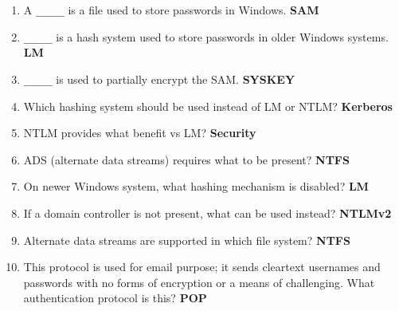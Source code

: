 \begin{enumerate}
    \item A \verb|_____| is a file used to store passwords in Windows. \textbf{SAM} 
    \item \verb|_____| is a hash system used to store passwords in older Windows systems. \textbf{LM} 
    \item \verb|_____| is used to partially encrypt the SAM. \textbf{SYSKEY} 
    \item Which hashing system should be used instead of LM or NTLM? \textbf{Kerberos} 
    \item NTLM provides what benefit vs LM? \textbf{Security} 
    \item ADS (alternate data streams) requires what to be present? \textbf{NTFS} 
    \item On newer Windows system, what hashing mechanism is disabled? \textbf{LM} 
    \item If a domain controller is not present, what can be used instead? \textbf{NTLMv2} 
    \item Alternate data streams are supported in which file system? \textbf{NTFS}
    \item This protocol is used for email purpose; it sends cleartext usernames and passwords with no forms of encryption or a means of challenging. What authentication protocol is this? \textbf{POP}  
\end{enumerate}

